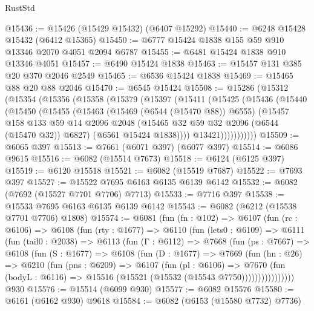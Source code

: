 \begin{lexlean}{RustStd}
\begin{coremodule}
@15436 := @15426 (@15429 @15432) (@6407 @15292)
@15440 := @6248 @15428 @15432 (@6412 @15365)
@15450 := @6777 @15424 @1838 @155 @59 @910 @13346 @2070 @4051 @2094 @6787
@15455 := @6481 @15424 @1838 @910 @13346 @4051
@15457 := @6490 @15424 @1838
@15463 := @15457 @131 @385 @20 @370 @2046 @2549
@15465 := @6536 @15424 @1838
@15469 := @15465 @88 @20 @88 @2046
@15470 := @6545 @15424
@15508 := @15286
    (@15312
      (@15354
        (@15356
          (@15358
            (@15379
              (@15397
                (@15411
                  (@15425
                    (@15436
                      (@15440
                        (@15450
                          (@15455
                            (@15463
                              (@15469 (@6544 (@15470 @88)) @6555)
                              (@15457
                                @158
                                @133
                                @59
                                @14
                                @2096
                                @2048
                                (@15465 @32 @59 @32 @2096 (@6544 (@15470 @32)) @6827)
                                (@6561 @15424 @1838))))
                          @13421)))))))))))
@15509 := @6065 @397
@15513 := @7661 (@6071 @397) (@6077 @397)
@15514 := @6086 @9615
@15516 := @6082 (@15514 @7673)
@15518 := @6124 (@6125 @397)
@15519 := @6120 @15518
@15521 := @6082 (@15519 @7687)
@15522 := @7693 @397
@15527 := @15522 @7695 @6163 @6135 @6139 @6142
@15532 := @6082 (@7692 (@15527 @7701 @7706) @7713)
@15533 := @7716 @397
@15538 := @15533 @7695 @6163 @6135 @6139 @6142
@15543 := @6082 (@6212 (@15538 @7701 @7706) @1808)
@15574 := @6081
    (fun (fn : @102) =>
    @6107
      (fun (rc : @6106) =>
      @6108
        (fun (rty : @1677) =>
        @6110
          (fun (lets0 : @6109) =>
          @6111
            (fun (tail0 : @2038) =>
            @6113
              (fun (Γ : @6112) =>
              @7668
                (fun (ps : @7667) =>
                @6108
                  (fun (S : @1677) =>
                  @6108
                    (fun (D : @1677) =>
                    @7669
                      (fun (hn : @26) =>
                      @6210
                        (fun (pns : @6209) =>
                        @6107
                          (fun (pl : @6106) =>
                          @7670
                            (fun (bodyL : @6116) =>
                            @15516 (@15521 (@15532 (@15543 @7750))))))))))))))))
    @930
@15576 := @15514 (@6099 @930)
@15577 := @6082 @15576
@15580 := @6161 (@6162 @930) @9618
@15584 := @6082 (@6153 (@15580 @7732) @7736)

\end{coremodule}
\end{lexlean}
